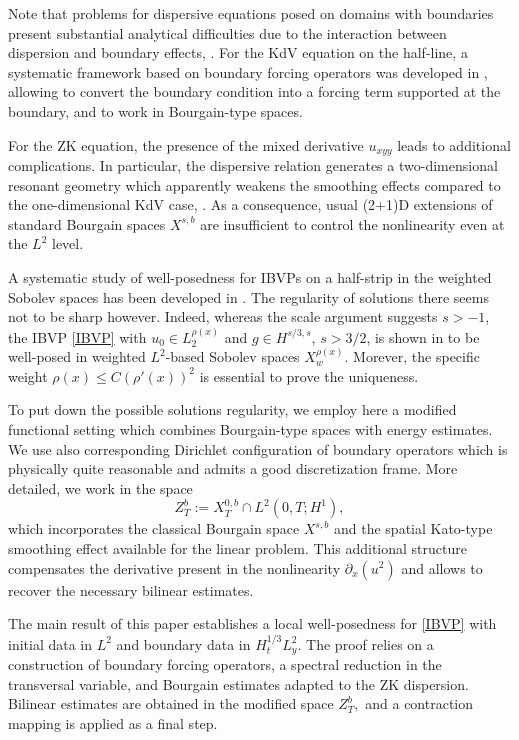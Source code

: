 \documentclass[11pt]{article}
\numberwithin{equation}{section}
\begin{document}
Note that problems for dispersive equations posed on domains
with boundaries present substantial analytical difficulties due to
the interaction between dispersion and boundary effects, \cite{BF}. For the KdV
equation on the half-line, a systematic framework based on boundary
forcing operators was developed in \cite{BSZ, CK}, allowing to
convert the boundary condition into a forcing term supported at the
boundary, and to work in Bourgain-type spaces.

For the ZK equation, the presence of the mixed derivative $u_{xyy}$
leads to additional complications. In particular, the dispersive
relation generates a two-dimensional resonant geometry which apparently weakens
the smoothing effects compared to the one-dimensional KdV case,
\cite{GH, FP, LP, SL, MP, MR}. %
As a consequence, usual (2+1)D extensions of standard
Bourgain spaces $X^{s,b}$ are insufficient to control the
nonlinearity even at the $L^2$ level.

A systematic study of well-posedness for IBVPs on a half-strip in
the weighted Sobolev spaces has been developed in \cite{F}. The
regularity of solutions there seems not to be sharp however. Indeed, whereas the scale argument suggests $s>-1$, the IBVP \eqref{IBVP} with $u_{0}\in L^{\rho(x)}_{2}$ and $g\in H^{s/3,s}$, $s>3/2$, is shown in \cite{F} to be well-posed in weighted $L^{2}$-based Sobolev spaces $X^{\rho(x)}_{w}$. Morever, the specific weight $\rho(x)\leq C(\rho'(x))^{2}$ is essential to prove the uniqueness.

To put down the possible solutions regularity, we employ here a modified functional setting
which combines Bourgain-type spaces with energy estimates. We use
also corresponding Dirichlet configuration of boundary operators
which is physically quite reasonable and admits a good
discretization frame. More detailed, we work in the space
$$
Z^{b}_{T}:= X^{0,b}_{T} \cap L^{2}(0,T;H^{1}),
$$
which incorporates the classical Bourgain space $X^{s,b}$ and the spatial Kato-type smoothing effect available for the
linear problem. This additional structure compensates the derivative
present in the nonlinearity $\partial_x(u^2)$ and allows to
recover the necessary bilinear estimates.

The main result of this paper establishes a local well-posedness for
\eqref{IBVP} with initial data in $L^2$ and boundary data in
$H^{1/3}_t L^2_y.$ The proof relies on a construction of boundary
forcing operators, a spectral reduction in the
transversal variable, and Bourgain estimates adapted to the ZK
dispersion. Bilinear estimates are obtained in the modified space
$Z^b_T,$ and a contraction mapping is applied as a final step.
\end{document}
